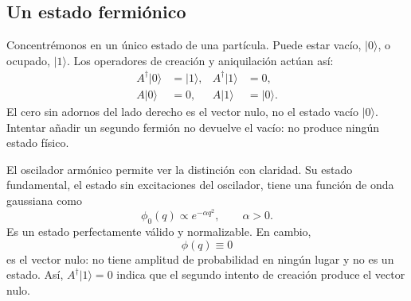 \subsection{Un estado fermiónico}

Concentrémonos en un único estado de una partícula. Puede estar vacío, \(|0\rangle\), o ocupado, \(|1\rangle\). Los operadores de creación y aniquilación actúan así:
\begin{align}
A^\dagger|0\rangle&=|1\rangle,
&
A^\dagger|1\rangle&=0,
\\
A|0\rangle&=0,
&
A|1\rangle&=|0\rangle.
\end{align}
El cero sin adornos del lado derecho es el vector nulo, no el estado vacío \(|0\rangle\). Intentar añadir un segundo fermión no devuelve el vacío: no produce ningún estado físico.

\begin{classroomqa}\end{classroomqa}

\begin{classroomqa}\end{classroomqa}

El oscilador armónico permite ver la distinción con claridad. Su estado fundamental, el estado sin excitaciones del oscilador, tiene una función de onda gaussiana como
\begin{equation}
\phi_0(q)\propto e^{-\alpha q^2},
\qquad \alpha>0.
\end{equation}
Es un estado perfectamente válido y normalizable. En cambio,
\begin{equation}
\phi(q)\equiv0
\end{equation}
es el vector nulo: no tiene amplitud de probabilidad en ningún lugar y no es un estado. Así, \(A^\dagger|1\rangle=0\) indica que el segundo intento de creación produce el vector nulo.

\begin{classroomqa}\end{classroomqa}

